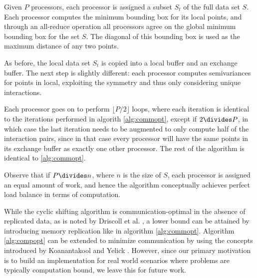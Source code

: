 Given $P$ processors, each processor is assigned a subset $S_t$ of the full data set $S$. Each processor computes the minimum bounding box for its local points, and through an all-reduce operation all processors agree on the global minimum bounding box for the set $S$. The diagonal of this bounding box is used as the maximum distance of any two points.

As before, the local data set $S_t$ is copied into a local buffer and an exchange buffer. The next step is slightly different: each processor computes semivariances for points in local, exploiting the symmetry and thus only considering unique interactions. 

Each processor goes on to perform $\lfloor P / 2 \rfloor$ loops, where each iteration is identical to the iterations performed in algorith \ref{alg:commopt}, except if $2 \divides P$, in which case the last iteration needs to be augmented to only compute half of the interaction pairs, since in that case every processor will have the same points in its exchange buffer as exactly one other processor. The rest of the algorithm is identical to \ref{alg:commopt}.

Observe that if $P \divides n$, where $n$ is the size of $S$, each processor is assigned an equal amount of work, and hence the algorithm conceptually achieves perfect load balance in terms of computation.

While the cyclic shifting algorithm is communication-optimal in the absence of replicated data, as is noted by Driscoll et al. \cite{Driscoll2013}, a lower bound can be attained by introducing memory replication like in algorithm \ref{alg:commopt}. Algorithm \ref{alg:compopt} can be extended to minimize communication by using the concepts introduced by Koanantakool and Yelick \cite{Koanantakool}. However, since our primary motivation is to build an implementation for real world scenarios where problems are typically computation bound, we leave this for future work.





